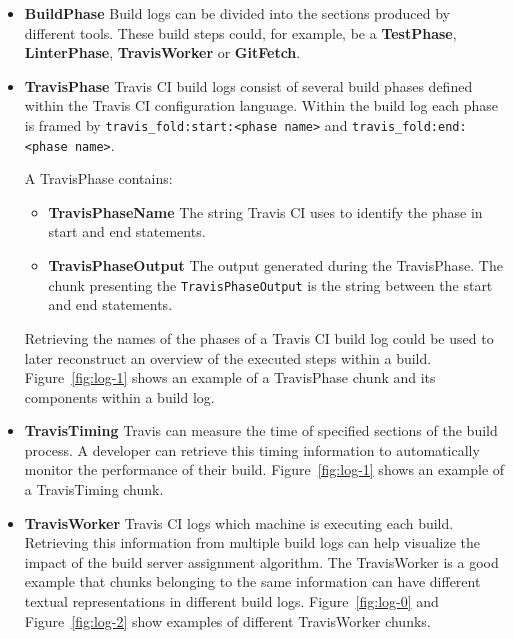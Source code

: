 \documentclass[\myrootdir/main.tex]{subfiles}
\begin{document}
\begin{itemize}
	\item \textbf{BuildPhase} Build logs can be divided into the sections produced by different tools.
	      These build steps could, for example, be a \textbf{TestPhase}, \textbf{LinterPhase}, \textbf{TravisWorker} or \textbf{GitFetch}.

	\item \textbf{TravisPhase} Travis CI build logs consist of several build phases defined within the Travis CI configuration language. Within the build log each phase is framed by \lstinline{travis_fold:start:<phase name>} and \lstinline{travis_fold:end:<phase name>}.

	      A TravisPhase contains:
	      \begin{itemize}
		      \item \textbf{TravisPhaseName} The string Travis CI uses to identify the phase in start and end statements.
		      \item \textbf{TravisPhaseOutput} The output generated during the TravisPhase. The chunk presenting the \texttt{TravisPhaseOutput} is the string between the start and end statements.
	      \end{itemize}
				 Retrieving the names of the phases of a Travis CI build log could be used to later reconstruct an overview of the executed steps within a build.
	       Figure~\ref{fig:log-1} shows an example of a TravisPhase chunk and its components within a build log.

	\item \textbf{TravisTiming} Travis can measure the time of specified sections of the build process.
				A developer can retrieve this timing information to automatically monitor the performance of their build.
	      Figure~\ref{fig:log-1} shows an example of a TravisTiming chunk.

	\item \textbf{TravisWorker} Travis CI logs which machine is executing each build.
	      Retrieving this information from multiple build logs can help visualize the impact of the build server assignment algorithm.
	      The TravisWorker is a good example that chunks belonging to the same information can have different textual representations in different build logs.
	      Figure~\ref{fig:log-0} and Figure~\ref{fig:log-2} show examples of different TravisWorker chunks.


\end{itemize}
\end{document}
